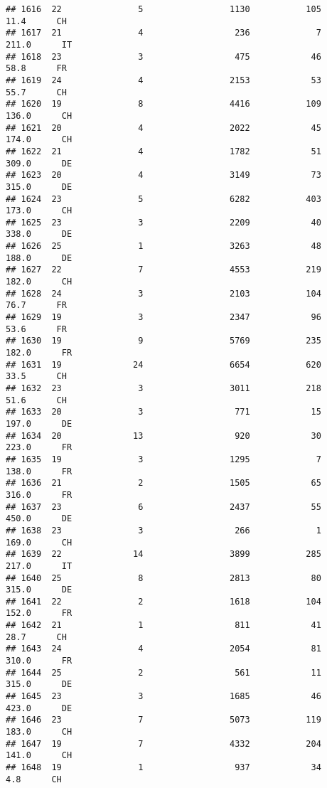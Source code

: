 \documentclass[
]{article}
\begin{document}
\begin{verbatim}
## 1616  22               5                 1130           105     11.4      CH
## 1617  21               4                  236             7    211.0      IT
## 1618  23               3                  475            46     58.8      FR
## 1619  24               4                 2153            53     55.7      CH
## 1620  19               8                 4416           109    136.0      CH
## 1621  20               4                 2022            45    174.0      CH
## 1622  21               4                 1782            51    309.0      DE
## 1623  20               4                 3149            73    315.0      DE
## 1624  23               5                 6282           403    173.0      CH
## 1625  23               3                 2209            40    338.0      DE
## 1626  25               1                 3263            48    188.0      DE
## 1627  22               7                 4553           219    182.0      CH
## 1628  24               3                 2103           104     76.7      FR
## 1629  19               3                 2347            96     53.6      FR
## 1630  19               9                 5769           235    182.0      FR
## 1631  19              24                 6654           620     33.5      CH
## 1632  23               3                 3011           218     51.6      CH
## 1633  20               3                  771            15    197.0      DE
## 1634  20              13                  920            30    223.0      FR
## 1635  19               3                 1295             7    138.0      FR
## 1636  21               2                 1505            65    316.0      FR
## 1637  23               6                 2437            55    450.0      DE
## 1638  23               3                  266             1    169.0      CH
## 1639  22              14                 3899           285    217.0      IT
## 1640  25               8                 2813            80    315.0      DE
## 1641  22               2                 1618           104    152.0      FR
## 1642  21               1                  811            41     28.7      CH
## 1643  24               4                 2054            81    310.0      FR
## 1644  25               2                  561            11    315.0      DE
## 1645  23               3                 1685            46    423.0      DE
## 1646  23               7                 5073           119    183.0      CH
## 1647  19               7                 4332           204    141.0      CH
## 1648  19               1                  937            34      4.8      CH

\end{verbatim}
\end{document}
